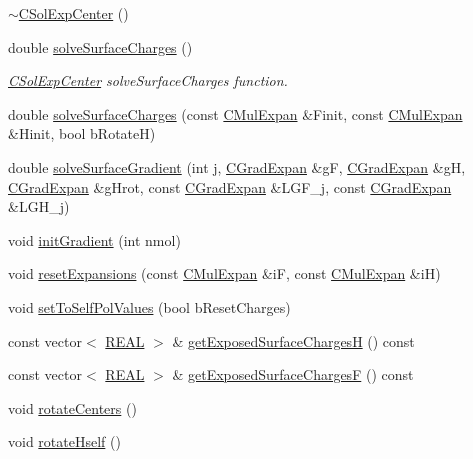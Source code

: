 \begin{DoxyCompactItemize}
\item 
\hyperlink{classCSolExpCenter_a949fa959b318f2074a1407ac3ed9c6cb}{$\sim$\-C\-Sol\-Exp\-Center} ()
\item 
double \hyperlink{classCSolExpCenter_acb655be5f48a409571c6b7dacf4246bd}{solve\-Surface\-Charges} ()
\begin{DoxyCompactList}\small\item\em \hyperlink{classCSolExpCenter}{C\-Sol\-Exp\-Center} solve\-Surface\-Charges function. \end{DoxyCompactList}\item 
double \hyperlink{classCSolExpCenter_a0c8ce070d8eda3cfc44450c80f526338}{solve\-Surface\-Charges} (const \hyperlink{classCMulExpan}{C\-Mul\-Expan} \&Finit, const \hyperlink{classCMulExpan}{C\-Mul\-Expan} \&Hinit, bool b\-Rotate\-H)
\item 
double \hyperlink{classCSolExpCenter_a8b20cab73adf0d2553dcee84b0f0cb9a}{solve\-Surface\-Gradient} (int j, \hyperlink{classCGradExpan}{C\-Grad\-Expan} \&g\-F, \hyperlink{classCGradExpan}{C\-Grad\-Expan} \&g\-H, \hyperlink{classCGradExpan}{C\-Grad\-Expan} \&g\-Hrot, const \hyperlink{classCGradExpan}{C\-Grad\-Expan} \&L\-G\-F\-\_\-j, const \hyperlink{classCGradExpan}{C\-Grad\-Expan} \&L\-G\-H\-\_\-j)
\item 
void \hyperlink{classCSolExpCenter_a28f12f11f479d838ad50545211bd2b2c}{init\-Gradient} (int nmol)
\item 
void \hyperlink{classCSolExpCenter_a9aeed3ddeb31d18f2639a776bbe386e3}{reset\-Expansions} (const \hyperlink{classCMulExpan}{C\-Mul\-Expan} \&i\-F, const \hyperlink{classCMulExpan}{C\-Mul\-Expan} \&i\-H)
\item 
void \hyperlink{classCSolExpCenter_a3ac164a26cb0777948e0e967960a8933}{set\-To\-Self\-Pol\-Values} (bool b\-Reset\-Charges)
\item 
const vector$<$ \hyperlink{util_8h_a5821460e95a0800cf9f24c38915cbbde}{R\-E\-A\-L} $>$ \& \hyperlink{classCSolExpCenter_af736a5799b28be29a9e9068de43f38d6}{get\-Exposed\-Surface\-Charges\-H} () const 
\item 
const vector$<$ \hyperlink{util_8h_a5821460e95a0800cf9f24c38915cbbde}{R\-E\-A\-L} $>$ \& \hyperlink{classCSolExpCenter_a8bd14d03d09f13eb6a5668c94c999d20}{get\-Exposed\-Surface\-Charges\-F} () const 
\item 
void \hyperlink{classCSolExpCenter_af90febadc818c915df8f3725a08d3506}{rotate\-Centers} ()
\item 
void \hyperlink{classCSolExpCenter_a774c8c28875f73a268a5cf6f485b574c}{rotate\-Hself} ()

\end{DoxyCompactItemize}
